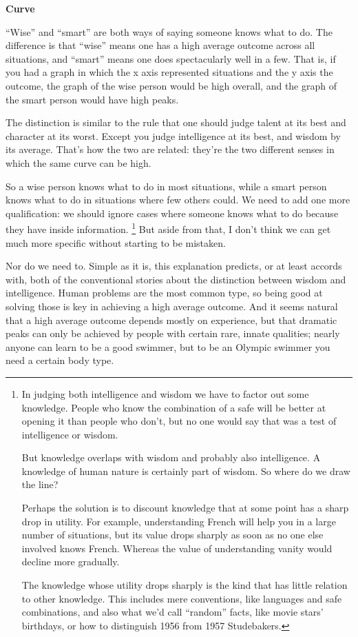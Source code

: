 \textbf{Curve}

``Wise'' and ``smart'' are both ways of saying someone knows what to do.
The difference is that ``wise'' means one has a high average outcome
across all situations, and ``smart'' means one does spectacularly well
in a few. That is, if you had a graph in which the x axis represented
situations and the y axis the outcome, the graph of the wise person
would be high overall, and the graph of the smart person would have high
peaks.

The distinction is similar to the rule that one should judge talent at
its best and character at its worst. Except you judge intelligence at
its best, and wisdom by its average. That's how the two are related:
they're the two different senses in which the same curve can be high.

So a wise person knows what to do in most situations, while a smart
person knows what to do in situations where few others could. We need to
add one more qualification: we should ignore cases where someone knows
what to do because they have inside information. \footnote{In judging both intelligence and wisdom we have to factor out
some knowledge. People who know the combination of a safe will be better
at opening it than people who don't, but no one would say that was a
test of intelligence or wisdom.

But knowledge overlaps with wisdom and probably also intelligence. A
knowledge of human nature is certainly part of wisdom. So where do we
draw the line?

Perhaps the solution is to discount knowledge that at some point has a
sharp drop in utility. For example, understanding French will help you
in a large number of situations, but its value drops sharply as soon as
no one else involved knows French. Whereas the value of understanding
vanity would decline more gradually.

The knowledge whose utility drops sharply is the kind that has little
relation to other knowledge. This includes mere conventions, like
languages and safe combinations, and also what we'd call ``random''
facts, like movie stars' birthdays, or how to distinguish 1956 from 1957
Studebakers.}
But aside from that, I don't think we can get much more specific without
starting to be mistaken.

Nor do we need to. Simple as it is, this explanation predicts, or at
least accords with, both of the conventional stories about the
distinction between wisdom and intelligence. Human problems are the most
common type, so being good at solving those is key in achieving a high
average outcome. And it seems natural that a high average outcome
depends mostly on experience, but that dramatic peaks can only be
achieved by people with certain rare, innate qualities; nearly anyone
can learn to be a good swimmer, but to be an Olympic swimmer you need a
certain body type.

